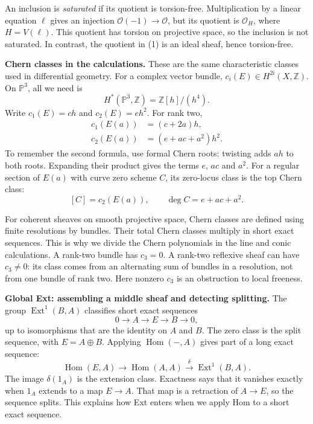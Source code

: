 \documentclass[11pt,a4paper]{article}
\theoremstyle{remark}
\begin{document}
An inclusion is \emph{saturated} if
its quotient is torsion-free.
Multiplication by a linear equation
$\ell$ gives an injection
$\mathcal{O}(-1)\to\mathcal{O}$,
but its quotient is $\mathcal{O}_H$,
where $H=V(\ell)$. This quotient has
torsion on projective space, so the
inclusion is not saturated.
In contrast, the quotient in (1) is
an ideal sheaf, hence torsion-free.

\textbf{Chern classes in the calculations.}
These are the same characteristic
classes used in differential geometry.
For a complex vector bundle,
$c_i(E)\in H^{2i}(X,\mathbb{Z})$.
On $\mathbb{P}^3$, all we need is
$$
H^*(\mathbb{P}^3,\mathbb{Z})
=\mathbb{Z}[h]/(h^4).
$$
Write $c_1(E)=ch$ and $c_2(E)=eh^2$.
For rank two,
$$
\begin{aligned}
c_1(E(a))&=(c+2a)h,\\
c_2(E(a))&=(e+ac+a^2)h^2.
\end{aligned}
$$
To remember the second formula, use
formal Chern roots: twisting adds
$ah$ to both roots. Expanding their
product gives the terms $e$, $ac$
and $a^2$.
For a regular section of $E(a)$ with
curve zero scheme $C$, its zero-locus
class is the top Chern class:
$$
[C]=c_2(E(a)),\qquad
\deg C=e+ac+a^2.
$$

For coherent sheaves on smooth
projective space, Chern classes are
defined using finite resolutions by
bundles. Their total Chern classes
multiply in short exact sequences.
This is why we divide the Chern
polynomials in the line and conic
calculations.
A rank-two bundle has $c_3=0$.
A rank-two reflexive sheaf can have
$c_3\ne0$: its class comes from an
alternating sum of bundles in a
resolution, not from one bundle of
rank two. Here nonzero $c_3$ is an
obstruction to local freeness.

\textbf{Global Ext: assembling a middle
sheaf and detecting splitting.}
The group $\operatorname{Ext}^1(B,A)$
classifies short exact sequences
$$
0\longrightarrow A\longrightarrow E
\longrightarrow B\longrightarrow0,
$$
up to isomorphisms that are the identity
on $A$ and $B$. The zero class is the
split sequence, with $E=A\oplus B$.
Applying $\operatorname{Hom}(-,A)$
gives part of a long exact sequence:
$$
\operatorname{Hom}(E,A)
\longrightarrow\operatorname{Hom}(A,A)
\xrightarrow{\delta}
\operatorname{Ext}^1(B,A).
$$
The image $\delta(1_A)$ is the extension
class. Exactness says that it vanishes
exactly when $1_A$ extends to a map
$E\to A$. That map is a retraction of
$A\to E$, so the sequence splits.
This explains how Ext enters when
we apply Hom to a short exact sequence.
\end{document}
